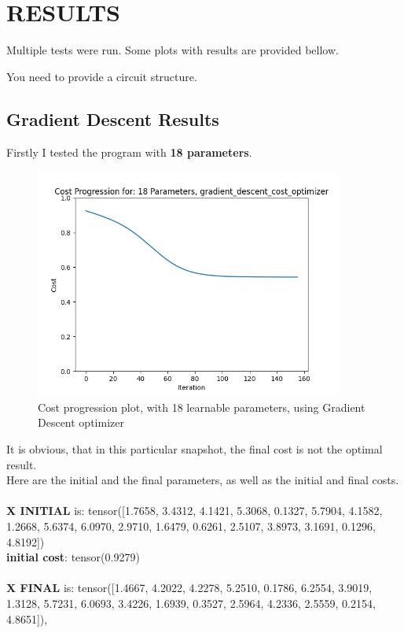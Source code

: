 \documentclass[inscr,ack,preface]{diphdthesis}
\begin{document}
\chapter{RESULTS}
Multiple tests were run. Some plots with results are provided bellow.

You need to provide a circuit structure.

\section{Gradient Descent Results}

Firstly I tested the program with \textbf{18 parameters}.\\

\begin{figure}[ht]
\begin{center}
    \includegraphics[width=0.9\textwidth]{plots/18.png}
    \caption{Cost progression plot, with 18 learnable parameters, using Gradient Descent optimizer} 
    \label{fig:enter-label}
    \end{center}
\end{figure}

It is obvious, that in this particular snapshot, the final cost is not the optimal result.
\\Here are the initial and the final parameters, as well as the initial and final costs. 
\\\\\textbf{X INITIAL} is:
 tensor([1.7658, 3.4312, 4.1421, 5.3068, 0.1327, 5.7904, 4.1582, 1.2668, 5.6374,
        6.0970, 2.9710, 1.6479, 0.6261, 2.5107, 3.8973, 3.1691, 0.1296, 4.8192])
\\
\textbf{initial cost}: tensor(0.9279)
\\\\\textbf{X FINAL} is:
 tensor([1.4667, 4.2022, 4.2278, 5.2510, 0.1786, 6.2554, 3.9019, 1.3128, 5.7231,
        6.0693, 3.4226, 1.6939, 0.3527, 2.5964, 4.2336, 2.5559, 0.2154, 4.8651]),
\end{document}
